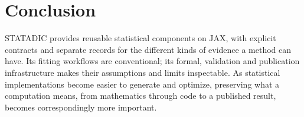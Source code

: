 \section{Conclusion}\label{sec:conclusion}

STATADIC provides reusable statistical components on JAX, with explicit contracts
and separate records for the different kinds of evidence a method can have. Its
fitting workflows are conventional; its formal, validation and publication
infrastructure makes their assumptions and limits inspectable. As statistical
implementations become easier to generate and optimize, preserving what a
computation means, from mathematics through code to a published result, becomes
correspondingly more important.
